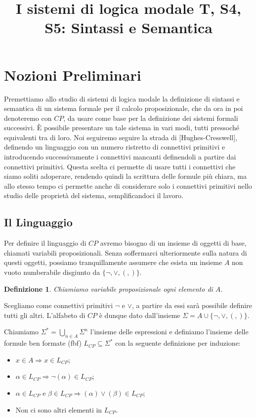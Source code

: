 \documentclass[a4paper, 12pt]{article}
\title{I sistemi di logica modale T, S4, S5: Sintassi e Semantica}
\date{}
\newtheorem{definition}{Definizione}
\begin{document}
\maketitle
\section{Nozioni Preliminari}
Premettiamo allo studio di sistemi di logica modale la definizione
di sintassi e semantica di un sistema formale per il calcolo proposizionale,
che da ora in poi denoteremo con $CP$, da usare come base per la definizione
dei sistemi formali successivi.
È possibile presentare un tale sistema in vari modi, tutti pressoché equivalenti tra di loro.
Noi seguiremo seguire la strada di [Hughes-Cresswell], definendo un linguaggio con un numero ristretto
di connettivi primitivi e introducendo successivamente i connettivi mancanti definendoli a partire
dai connettivi primitivi.
Questa scelta ci permette di usare tutti i connettivi che siamo soliti adoperare,
rendendo quindi la scrittura delle formule più chiara, ma allo stesso tempo ci permette anche di
considerare solo i connettivi primitivi nello studio delle proprietà del sistema,
semplificandoci il lavoro.

\subsection{Il Linguaggio}
Per definire il linguaggio di $CP$ avremo bisogno di un insieme di oggetti di base,
chiamati variabili proposizionali. Senza soffermarci ulteriormente sulla natura di questi oggetti,
possiamo tranquillamente assumere che esista un insieme $A$ non vuoto numberabile
disgiunto da $\{\neg, \lor, (, )\}$.

\begin{definition}
Chiamiamo variabile proposizionale ogni elemento di $A$.
\end{definition}

Scegliamo come connettivi primitivi $\neg$ e $\lor$,
a partire da essi sarà possibile definire tutti gli altri.
L'alfabeto di $CP$ è dunque dato dall'insieme $\Sigma = A \cup \{\neg, \lor, (, )\}$.

Chiamiamo $\Sigma^{*} = \bigcup_{n \in A} \Sigma^n$ l'insieme delle espressioni
e definiamo l'insieme delle formule ben formate (fbf) $L_{CP} \subseteq \Sigma^{*}$ con la seguente definizione
per induzione:
\begin{itemize}
\item $x \in A \Rightarrow x \in L_{CP}$;
\item $\alpha \in L_{CP} \Rightarrow \neg (\alpha) \in L_{CP}$;
\item $\alpha \in L_{CP}$ e $\beta \in L_{CP} \Rightarrow (\alpha) \lor (\beta) \in L_{CP}$;
\item Non ci sono altri elementi in $L_{CP}$.
\end{itemize}
\end{document}

